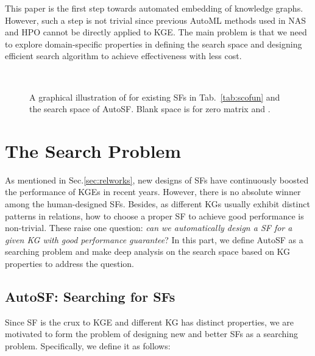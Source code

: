 \documentclass[conference]{IEEEtran}
\begin{document}
This paper is the first step towards automated embedding of knowledge graphs.
However,
such a step is not trivial
since previous AutoML methods used in NAS and HPO
cannot be directly applied to KGE.
The main problem is that we need to explore domain-specific properties 
in defining the search space and
designing efficient search algorithm
to achieve effectiveness with less cost.



\begin{figure*}[ht]
	\centering
	\ 
\ 
\ 
	\quad\quad
	\vspace{-5px}
	\caption{A graphical illustration of  for existing SFs in Tab.~\ref{tab:scofun}
		and the search space of AutoSF.
		Blank space is for zero matrix
		and .}
	\label{fig:graphsf}
	\vspace{-15px}
\end{figure*}


\section{The Search Problem} 
\label{sec:search}

As mentioned in Sec.\ref{sec:relworks}, 
new designs of SFs have continuously boosted
the performance of KGEs in recent years.
However, there is no absolute winner among the human-designed SFs.
Besides,
as different KGs usually exhibit distinct patterns in relations,
how to choose a proper SF to achieve good performance is non-trivial.
These raise one question:
\textit{can we automatically design a SF for a given KG with good performance guarantee}?
In this part,
we define AutoSF as a searching problem and make deep analysis on the search space based on KG properties
to address the question.

\subsection{AutoSF: Searching for SFs}
\label{ssec:searSFs}
Since SF is the crux to KGE
and different KG has distinct properties,
we are motivated to form the problem of designing new and better SFs
as a searching problem.
Specifically,
we define it as follows:
\end{document}
